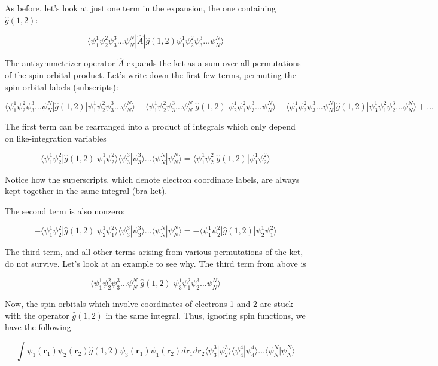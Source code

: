 \documentclass[11pt]{article}
\begin{document}
As before, let's look at just one term in the expansion, the one
containing \(\hat{g}(1,2)\):

\[\langle \psi_1^1 \psi_2^2 \psi_3^3 \dots \psi_N^N | \hat{A} |  \hat{g}(1,2) \psi_1^1 \psi_2^2 \psi_3^3 \dots \psi_N^N  \rangle \]

The antisymmetrizer operator \(\hat{A}\) expands the ket as a sum over
all permutations of the spin orbital product. Let's write down the first
few terms, permuting the spin orbital labels (subscripts):

\[\langle \psi_1^1 \psi_2^2 \psi_3^3 \dots \psi_N^N |\hat{g}(1,2)| \psi_1^1 \psi_2^2 \psi_3^3 \dots \psi_N^N  \rangle  -  \langle \psi_1^1 \psi_2^2 \psi_3^3 \dots \psi_N^N |\hat{g}(1,2)| \psi_2^1 \psi_1^2 \psi_3^3 \dots \psi_N^N  \rangle  + \langle \psi_1^1 \psi_2^2 \psi_3^3 \dots \psi_N^N |\hat{g}(1,2)| \psi_3^1 \psi_1^2 \psi_2^3 \dots \psi_N^N  \rangle + ...  \]

The first term can be rearranged into a product of integrals which only
depend on like-integration variables

\[\langle \psi_1^1 \psi_2^2 | \hat{g}(1,2) | \psi_1^1 \psi_2^2 \rangle \langle \psi_3^3 | \psi_3^3 \rangle ... \langle \psi_N^N | \psi_N^N \rangle = \langle \psi_1^1 \psi_2^2 | \hat{g}(1,2) | \psi_1^1 \psi_2^2 \rangle  \]

Notice how the superscripts, which denote electron coordinate labels,
are always kept together in the same integral (bra-ket).

The second term is also nonzero:

\[-\langle \psi_1^1 \psi_2^2 | \hat{g}(1,2) | \psi_2^1 \psi_1^2 \rangle \langle \psi_3^3 | \psi_3^3 \rangle ... \langle \psi_N^N | \psi_N^N \rangle = -\langle \psi_1^1 \psi_2^2 | \hat{g}(1,2) | \psi_2^1 \psi_1^2 \rangle \]

The third term, and all other terms arising from various permutations of
the ket, do not survive. Let's look at an example to see why. The third
term from above is

\[\langle \psi_1^1 \psi_2^2 \psi_3^3 \dots \psi_N^N |\hat{g}(1,2)| \psi_3^1 \psi_1^2 \psi_2^3 \dots \psi_N^N  \rangle \]

Now, the spin orbitals which involve coordinates of electrons 1 and 2
are stuck with the operator \(\hat{g}(1,2)\) in the same integral. Thus,
ignoring spin functions, we have the following

\[\int \psi_1(\boldsymbol{r}_1) \psi_2(\boldsymbol{r}_2) \hat{g}(1,2) \psi_3(\boldsymbol{r}_1) \psi_1(\boldsymbol{r}_2) d\boldsymbol{r}_1d\boldsymbol{r}_2  \langle \psi_3^3 | \psi_2^3 \rangle \langle \psi_4^4 | \psi_4^4 \rangle \dots \langle \psi_N^N | \psi_N^N \rangle\]
\end{document}
